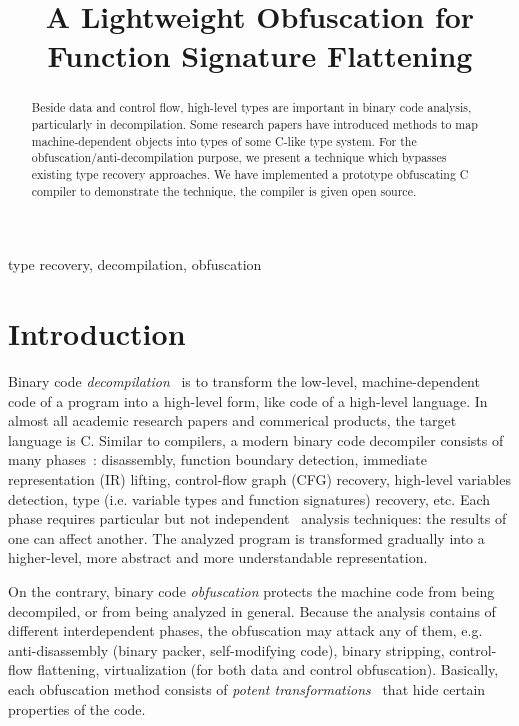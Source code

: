 \documentclass[compsoc,conference,a4paper,10pt,times]{IEEEtran}
\begin{document}
\title{A Lightweight Obfuscation for Function Signature Flattening}

\author{
}

\maketitle

\begin{abstract}
  Beside data and control flow, high-level types are important in binary code analysis, particularly in
  decompilation. Some research papers have introduced methods to map machine-dependent objects into types
  of some C-like type system. For the obfuscation/anti-decompilation purpose, we
  present a technique which bypasses existing type recovery approaches. We have implemented a
  prototype obfuscating C compiler to demonstrate the technique, the compiler is
  given open source.
\end{abstract}

\begin{IEEEkeywords}
type recovery, decompilation, obfuscation
\end{IEEEkeywords}

\section{Introduction}
\noindent
Binary code \emph{decompilation}~\cite{cifuentes_reverse_1994} is to transform the low-level,
machine-dependent code of a program into a high-level form, like code of a high-level language.
In almost all academic research papers and commerical products, the target language is C.
Similar to compilers, a modern binary code decompiler consists of many
phases~\cite{cifuentes_reverse_1994,van_emmerik_static_2007}: disassembly, function boundary detection, immediate
representation (IR) lifting, control-flow graph (CFG) recovery, high-level variables detection,
type (i.e. variable types and function signatures) recovery, etc. Each phase requires
particular but not independent~\cite{schwarz_disassembly_2002} analysis techniques: the results of
one can affect another. The analyzed program is
transformed gradually into a higher-level, more abstract and more understandable representation.

On the contrary, binary code \emph{obfuscation} protects the machine code from
being decompiled, or from being analyzed in general. Because the analysis contains of different
interdependent phases, the obfuscation may attack any of them, e.g. anti-disassembly
(binary packer, self-modifying code), binary stripping, control-flow flattening, virtualization (for both
data and control obfuscation). Basically, each obfuscation method consists of
\emph{potent transformations}~\cite{collberg_taxonomy_1997,dalla_preda_semantic-based_2005}
that hide certain properties of the code.
\end{document}

